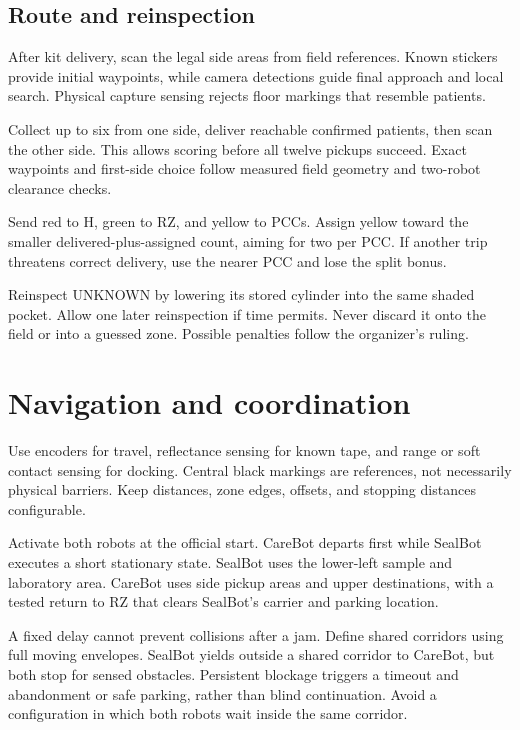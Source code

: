 \documentclass[10pt,a4paper]{article}
\begin{document}
\subsection{Route and reinspection}
After kit delivery, scan the legal side areas from field references. Known stickers provide initial waypoints, while camera detections guide final approach and local search. Physical capture sensing rejects floor markings that resemble patients.

Collect up to six from one side, deliver reachable confirmed patients, then scan the other side. This allows scoring before all twelve pickups succeed. Exact waypoints and first-side choice follow measured field geometry and two-robot clearance checks.

Send red to H, green to RZ, and yellow to PCCs. Assign yellow toward the smaller delivered-plus-assigned count, aiming for two per PCC. If another trip threatens correct delivery, use the nearer PCC and lose the split bonus.

Reinspect UNKNOWN by lowering its stored cylinder into the same shaded pocket. Allow one later reinspection if time permits. Never discard it onto the field or into a guessed zone. Possible penalties follow the organizer's ruling.

\section{Navigation and coordination}
Use encoders for travel, reflectance sensing for known tape, and range or soft contact sensing for docking. Central black markings are references, not necessarily physical barriers. Keep distances, zone edges, offsets, and stopping distances configurable.

Activate both robots at the official start. CareBot departs first while SealBot executes a short stationary state. SealBot uses the lower-left sample and laboratory area. CareBot uses side pickup areas and upper destinations, with a tested return to RZ that clears SealBot's carrier and parking location.

A fixed delay cannot prevent collisions after a jam. Define shared corridors using full moving envelopes. SealBot yields outside a shared corridor to CareBot, but both stop for sensed obstacles. Persistent blockage triggers a timeout and abandonment or safe parking, rather than blind continuation. Avoid a configuration in which both robots wait inside the same corridor.
\end{document}
